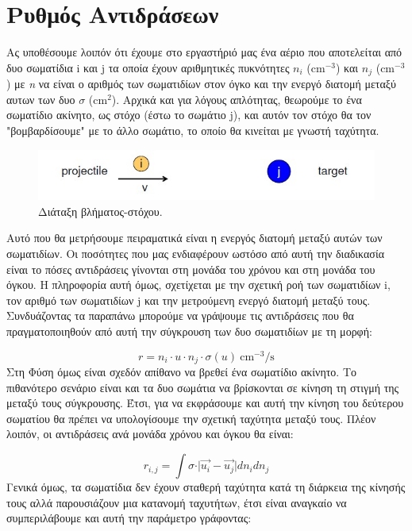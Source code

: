 \section{Ρυθμός Αντιδράσεων}
Aς υποθέσουμε λοιπόν ότι έχουμε στο εργαστήριό μας ένα αέριο που αποτελείται από δυο σωματίδια i και j τα οποία έχουν αριθμητικές πυκνότητες $n_{i}$ (cm$^{-3}$) και $n_{j}$ (cm$^{-3}$) με \textit{n} να είναι ο αριθμός των σωματιδίων στον όγκο και την ενεργό διατομή μεταξύ αυτων των δυο $\sigma$ (cm$^{2}$). Αρχικά και για λόγους απλότητας, θεωρούμε το ένα σωματίδιο ακίνητο, ως στόχο (έστω το σωμάτιο j), και αυτόν τον στόχο θα τον "βομβαρδίσουμε" με το άλλο σωμάτιο, το οποίο θα κινείται με γνωστή ταχύτητα. 

\begin{figure}
    \centering
    \includegraphics[scale=0.6]{Figures/target.jpg}  
    \caption{Διάταξη βλήματος-στόχου.}
    \label{fig:apx:target_projectile}
\end{figure} 

Aυτό που θα μετρήσουμε πειραματικά είναι η ενεργός διατομή μεταξύ αυτών των σωματιδίων. Οι ποσότητες που μας ενδιαφέρουν ωστόσο από αυτή την διαδικασία είναι το πόσες αντιδράσεις γίνονται στη μονάδα του χρόνου και στη μονάδα του όγκου. Η πληροφορία αυτή όμως, σχετίχεται με την σχετική ροή των σωματιδίων i, τον αριθμό των σωματιδίων j και την μετρούμενη ενεργό διατομή μεταξύ τους. Συνδυάζοντας τα παραπάνω μπορούμε να γράψουμε τις αντιδράσεις που θα πραγματοποιηθούν από αυτή την σύγκρουση των δυο σωματιδίων με τη μορφή:

\begin{equation}
\label{eq51}
r = n_{i}\cdot u \cdot n_{j}\cdot \sigma (u) \ \text{cm}^{-3}\text{/s}
\end{equation}
Στη Φύση όμως είναι σχεδόν απίθανο να βρεθεί ένα σωματίδιο ακίνητο. Το πιθανότερο σενάριο είναι και τα δυο σωμάτια να βρίσκονται σε κίνηση τη στιγμή της μεταξύ τους σύγκρουσης. Έτσι, για να εκφράσουμε  και αυτή την κίνηση του δεύτερου σωματίου θα πρέπει να υπολογίσουμε την σχετική ταχύτητα μεταξύ τους. Πλέον λοιπόν, οι αντιδράσεις ανά μονάδα χρόνου και όγκου θα είναι:

\begin{equation}
\label{eq52}
r_{i,j}= \int \sigma\cdot \vert \vec{u_{i}}- \vec{u_{j}} \vert dn_{i}dn_{j}
\end{equation}
Γενικά όμως, τα σωματίδια δεν έχουν σταθερή ταχύτητα κατά τη διάρκεια της κίνησής τους αλλά παρουσιάζουν μια κατανομή ταχυτήτων, έτσι είναι αναγκαίο να συμπεριλάβουμε και αυτή την παράμετρο γράφοντας:

